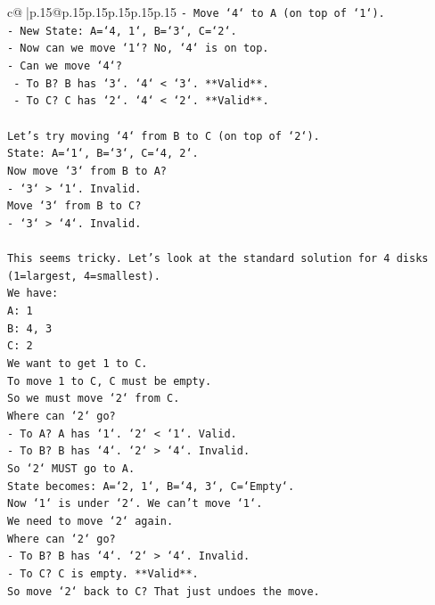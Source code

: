 \documentclass{article}
\begin{document}
{\begin{supertabular}{c@{$\;$}|p{.15\linewidth}@{}p{.15\linewidth}p{.15\linewidth}p{.15\linewidth}p{.15\linewidth}p{.15\linewidth}}
{{{\texttt{{-} Move `4` to A (on top of `1`).} \\
\texttt{{-} New State: A=`4, 1`, B=`3`, C=`2`.} \\
\texttt{{-} Now can we move `1`? No, `4` is on top.} \\
\texttt{{-} Can we move `4`?} \\
\texttt{  {-} To B? B has `3`. `4` < `3`. **Valid**.} \\
\texttt{  {-} To C? C has `2`. `4` < `2`. **Valid**.} \\
\\ 
\texttt{Let's try moving `4` from B to C (on top of `2`).} \\
\texttt{State: A=`1`, B=`3`, C=`4, 2`.} \\
\texttt{Now move `3` from B to A?} \\
\texttt{{-} `3` > `1`. Invalid.} \\
\texttt{Move `3` from B to C?} \\
\texttt{{-} `3` > `4`. Invalid.} \\
\\ 
\texttt{This seems tricky. Let's look at the standard solution for 4 disks (1=largest, 4=smallest).} \\
\texttt{We have:} \\
\texttt{A: 1} \\
\texttt{B: 4, 3} \\
\texttt{C: 2} \\
\texttt{We want to get 1 to C.} \\
\texttt{To move 1 to C, C must be empty.} \\
\texttt{So we must move `2` from C.} \\
\texttt{Where can `2` go?} \\
\texttt{{-} To A? A has `1`. `2` < `1`. Valid.} \\
\texttt{{-} To B? B has `4`. `2` > `4`. Invalid.} \\
\texttt{So `2` MUST go to A.} \\
\texttt{State becomes: A=`2, 1`, B=`4, 3`, C=`Empty`.} \\
\texttt{Now `1` is under `2`. We can't move `1`.} \\
\texttt{We need to move `2` again.} \\
\texttt{Where can `2` go?} \\
\texttt{{-} To B? B has `4`. `2` > `4`. Invalid.} \\
\texttt{{-} To C? C is empty. **Valid**.} \\
\texttt{So move `2` back to C? That just undoes the move.} \\
}}}
\end{supertabular}}
\end{document}
